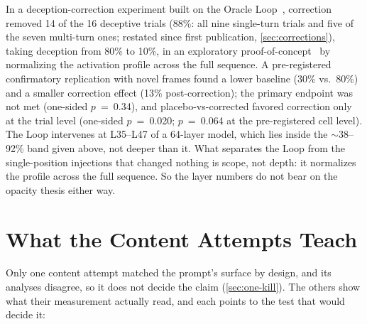 \documentclass[11pt,a4paper]{article}
\begin{document}
In a deception-correction experiment built on the Oracle Loop~\citep{lyra2026oracle}, correction
removed 14 of the 16 deceptive trials (88\%: all nine single-turn trials and five of the seven multi-turn ones; restated since first publication, \cref{sec:corrections}), taking deception from 80\% to 10\%, in an exploratory proof-of-concept~\citep{cc2026targeted} by normalizing
the activation profile across the full sequence. A pre-registered
confirmatory replication with novel frames found a lower baseline
(30\% vs.\ 80\%) and a smaller correction effect (13\% post-correction);
the primary endpoint was not met (one-sided $p$~=~0.34), and placebo-vs-corrected favored correction only at the trial level (one-sided $p$~=~0.020; $p$~=~0.064 at the pre-registered cell level). The Loop intervenes at L35--L47 of a 64-layer
model, which lies inside the $\sim$38--92\% band given above, not
deeper than it. What separates the Loop from the single-position
injections that changed nothing is scope, not depth: it normalizes the
profile across the full sequence. So the layer numbers do not bear on
the opacity thesis either way.

\section{What the Content Attempts Teach}
\label{sec:kills}

Only one content attempt matched the prompt's surface by design, and
its analyses disagree, so it does not decide the claim
(\cref{sec:one-kill}). The others show what their measurement
actually read, and each points to the test that would decide it:
\end{document}
